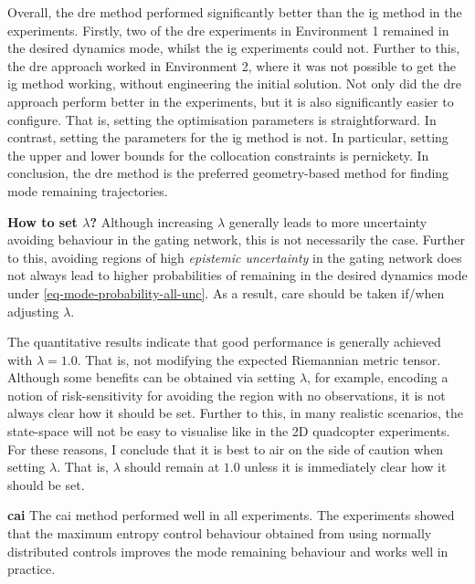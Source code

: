 \documentclass{mimosis-class/mimosis}
\numberwithin{equation}{chapter}
\begin{document}
{Overall, the \acrshort{dre} method performed significantly better than the \acrshort{ig} method in the experiments.
Firstly, two of the \acrshort{dre} experiments in Environment 1 remained in the desired dynamics mode,
whilst the \acrshort{ig} experiments could not.
Further to this, the \acrshort{dre} approach worked in Environment 2, where it was not possible to get the
\acrshort{ig} method working, without engineering the initial solution.
Not only did the \acrshort{dre} approach perform better in the experiments, but it is also significantly easier
to configure.
That is, setting the optimisation parameters is straightforward.
In contrast, setting the parameters for the \acrshort{ig} method is not.
In particular, setting the upper and lower bounds for the collocation constraints is pernickety.
In conclusion, the \acrshort{dre} method is the preferred geometry-based method for finding mode remaining
trajectories.

\textbf{How to set \(\lambda\)?}
Although increasing \(\lambda\) generally leads to more uncertainty avoiding behaviour in the gating network,
this is not necessarily the case.
Further to this,
avoiding regions of high \emph{epistemic uncertainty} in the gating network does not always lead to higher probabilities
of remaining in the desired dynamics mode under \cref{eq-mode-probability-all-unc}.
As a result, care should be taken if/when adjusting \(\lambda\).

The quantitative results indicate that good performance is generally achieved with \(\lambda=1.0\).
That is, not modifying the expected Riemannian metric tensor.
Although some benefits can be obtained via setting \(\lambda\),
for example, encoding a notion of risk-sensitivity for avoiding the region with no observations,
it is not always clear how it should be set.
Further to this, in many realistic scenarios, the state-space will not be easy to visualise like in
the 2D quadcopter experiments.
For these reasons, I conclude that it is best to air on the side of caution when setting \(\lambda\).
That is, \(\lambda\) should remain at \(1.0\) unless it is immediately clear how it should be set.


\textbf{\acrfull{cai}}
The \acrshort{cai} method performed well in all experiments.
The experiments showed that the maximum entropy control behaviour obtained from using normally distributed controls
improves the mode remaining behaviour and works well in practice.


}
\end{document}
